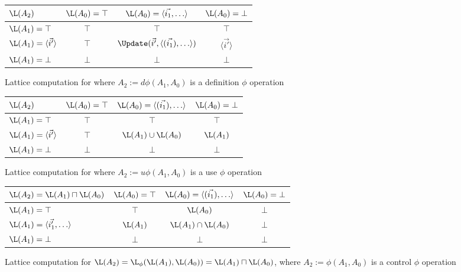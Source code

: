 \begin{figure}%
\begin{center}
\begin{tabular}{|l||c|c|c|}
\hline
$\L(A_2)$ & $\L(A_0) = \top$ & $\L(A_0) = \langle \vec{i_1}, \ldots \rangle $ & $\L(A_0) = \bot$ \\
\hline \hline
$\L(A_1) = \top$ & $\top$ & $\top$ & $\top$ \\
\hline
$\L(A_1) = \langle \vec{i'}\rangle$ & $\top$ &
$\Update(\vec{i'},\langle (\vec{i_1}), \ldots \rangle)$ & $\langle
\vec{i'} \rangle$ \\
\hline
$\L(A_1) = \bot$ & $\bot$ & $\bot$ & $\bot$ \\
\hline
\end{tabular}
\end{center}
\caption{Lattice computation for 
where $A_2 := d\phi(A_1, A_0)$ is
a definition $\phi$ operation}
\label{fig:scalrep-dphi}
\end{figure}

\begin{figure}%
\begin{center}
\begin{tabular}{|l||c|c|c|}
\hline
$\L(A_2)$ & $\L(A_0) = \top$ & $\L(A_0) = \langle (\vec{i_1}), \ldots \rangle $ & $\L(A_0) = \bot$ \\
\hline \hline
$\L(A_1) = \top$ & $\top$ & $\top$ & $\top$ \\
\hline
$\L(A_1) = \langle \vec{i'} \rangle$ & $\top$ & $ \L(A_1) \cup \L(A_0)$ & $ \L(A_1)$ \\
\hline
$\L(A_1) = \bot$ & $\bot$ & $\bot$ & $\bot$ \\
\hline
\end{tabular}
\end{center}
\caption{Lattice computation for 
where $A_2 := u\phi(A_1, A_0)$ is
a use $\phi$ operation}
\label{fig:scalrep-uphi}
\end{figure}


\begin{figure}%
\begin{center}
\begin{tabular}{|l||c|c|c|}
\hline
$\L(A_2) = \L(A_1) \sqcap \L(A_0) $ & $\L(A_0) = \top$ & $\L(A_0) = \langle (\vec{i_1}), \ldots \rangle $ & $\L(A_0) = \bot$ \\
\hline \hline
$\L(A_1) = \top$ & $\top$ & $\L(A_0)$ & $\bot$ \\
\hline
$\L(A_1) = \langle \vec{i'_1}, \ldots\rangle$ & $\L(A_1)$ & $\L(A_1) \cap \L(A_0)$ & $\bot$ \\
\hline
$\L(A_1) = \bot$ & $\bot$ & $\bot$ & $\bot$ \\
\hline
\end{tabular}
\end{center}
\caption{Lattice computation for 
$\L(A_2) = \L_{\phi}(\L(A_1), \L(A_0)) = \L(A_1) \sqcap \L(A_0) $,
where $A_2 := \phi(A_1, A_0)$ is
a control $\phi$ operation}
\label{fig:scalrep-join}
\end{figure}

